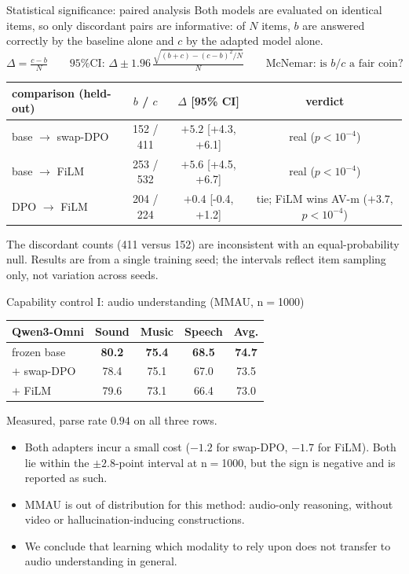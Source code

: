 \documentclass[aspectratio=169,11pt]{beamer}
\begin{document}
\begin{frame}{Statistical significance: paired analysis}
{\footnotesize Both models are evaluated on identical items, so only discordant pairs are
informative: of $N$ items, $b$ are answered correctly by the baseline alone and $c$ by the adapted
model alone.}
{\footnotesize
\[
\Delta=\tfrac{c-b}{N}\qquad
\text{95\% CI: }\Delta\pm 1.96\,\tfrac{\sqrt{(b+c)-(c-b)^2/N}}{N}\qquad
\text{McNemar: is }b/c\text{ a fair coin?}
\]}
\centering
\scriptsize
\renewcommand{\arraystretch}{1.1}
\begin{tabular}{l c c c}
\toprule
comparison (held-out) & $b$ / $c$ & $\Delta$ [95\% CI] & verdict \\
\midrule
base $\to$ swap-DPO & 152 / 411 & $+5.2$ [{+}4.3, {+}6.1] & real ($p<10^{-4}$) \\
base $\to$ FiLM     & 253 / 532 & $+5.6$ [{+}4.5, {+}6.7] & real ($p<10^{-4}$) \\
DPO $\to$ FiLM      & 204 / 224 & $+0.4$ [{-}0.4, {+}1.2] & tie; FiLM wins AV-m ($+3.7$, $p<10^{-4}$) \\
\bottomrule
\end{tabular}
\vspace{0.4em}
\par
{\footnotesize The discordant counts (411 versus 152) are inconsistent with an equal-probability
null. Results are from a single training seed; the intervals reflect item sampling only, not
variation across seeds.}
\end{frame}

\begin{frame}{Capability control I: audio understanding (MMAU, n$=$1000)}
\centering
\renewcommand{\arraystretch}{1.2}
\footnotesize
\begin{tabular}{l cccc}
\toprule
Qwen3-Omni & Sound & Music & Speech & Avg. \\
\midrule
frozen base    & \textbf{80.2} & \textbf{75.4} & \textbf{68.5} & \textbf{74.7} \\
$+$ swap-DPO   & 78.4 & 75.1 & 67.0 & 73.5 \\
$+$ FiLM       & 79.6 & 73.1 & 66.4 & 73.0 \\
\bottomrule
\end{tabular}
\par\vspace{0.3em}
{\scriptsize Measured, parse rate $0.94$ on all three rows.}
\vfill
\begin{itemize}\footnotesize
\item Both adapters incur a small cost ($-1.2$ for swap-DPO, $-1.7$ for FiLM). Both lie within the
$\pm2.8$-point interval at n$=$1000, but the sign is negative and is reported as such.
\item MMAU is out of distribution for this method: audio-only reasoning, without video or
hallucination-inducing constructions.
\item We conclude that learning which modality to rely upon does not transfer to audio
understanding in general.
\end{itemize}
\end{frame}
\end{document}
